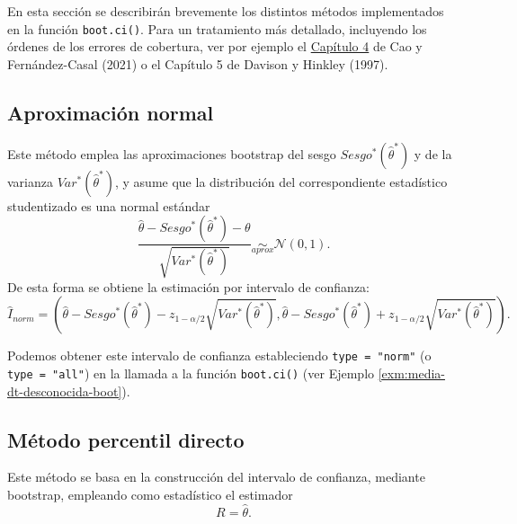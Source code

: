 \documentclass[
  10pt,
]{book}
\theoremstyle{break}
\theoremstyle{nonumberplain}
\begin{document}
En esta sección se describirán brevemente los distintos métodos implementados en la función \texttt{boot.ci()}.
Para un tratamiento más detallado, incluyendo los órdenes de los errores de cobertura, ver por ejemplo el \href{https://rubenfcasal.github.io/book_remuestreo/icboot.html}{Capítulo 4} de Cao y Fernández-Casal (2021) o el Capítulo 5 de Davison y Hinkley (1997).

\hypertarget{boot-ic-norm}{%
\subsection{Aproximación normal}\label{boot-ic-norm}}

Este método emplea las aproximaciones bootstrap del sesgo \(Sesgo^{\ast}\left( \hat{\theta}^{\ast} \right)\) y de la varianza \(Var^{\ast}\left( \hat{\theta}^{\ast} \right)\), y asume que la distribución del correspondiente estadístico studentizado es una normal estándar
\[\frac{\hat{\theta} - Sesgo^{\ast}\left( \hat{\theta}^{\ast} \right) - \theta}{\sqrt{Var^{\ast}\left( \hat{\theta}^{\ast} \right)}} \underset{aprox}{\sim }\mathcal{N}\left( 0, 1 \right).\]
De esta forma se obtiene la estimación por intervalo de confianza:
\[\hat{I}_{norm}=\left( \hat{\theta} - Sesgo^{\ast}\left( \hat{\theta}^{\ast} \right) - z_{1-\alpha /2}\sqrt{Var^{\ast}\left( \hat{\theta}^{\ast} \right)},\hat{\theta} - Sesgo^{\ast}\left( \hat{\theta}^{\ast} \right) + z_{1 - \alpha /2}\sqrt{Var^{\ast}\left( \hat{\theta}^{\ast} \right)} \right).\]

Podemos obtener este intervalo de confianza estableciendo \texttt{type\ =\ "norm"} (o \texttt{type\ =\ "all"}) en la llamada a la función \texttt{boot.ci()} (ver Ejemplo \ref{exm:media-dt-desconocida-boot}).

\hypertarget{boot-ic-perc}{%
\subsection{Método percentil directo}\label{boot-ic-perc}}

Este método se basa en la construcción del intervalo de confianza, mediante bootstrap, empleando como estadístico el estimador \[R = \hat{\theta}.\]
\end{document}
